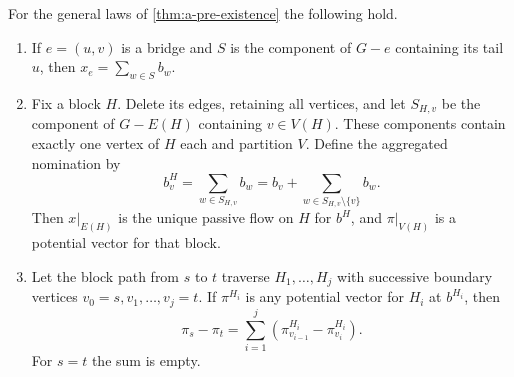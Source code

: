 \begin{lemma}
\label{lem:a-pre-block}
For the general laws of \cref{thm:a-pre-existence} the following hold.
\begin{enumerate}
\item If $e=(u,v)$ is a bridge and $S$ is the component of $G-e$
containing its tail $u$, then $x_e=\sum_{w\in S}b_w$.
\item Fix a block $H$. Delete its edges, retaining all vertices, and let
$S_{H,v}$ be the component of $G-E(H)$ containing $v\in V(H)$.
These components contain exactly one vertex of $H$ each and partition
$V$. Define the aggregated nomination by
\begin{equation}
 b^H_v=\sum_{w\in S_{H,v}}b_w
      =b_v+\sum_{w\in S_{H,v}\setminus\{v\}}b_w.
 \label{eq:a-pre-aggregation}
\end{equation}
Then $x|_{E(H)}$ is the unique passive flow on $H$ for $b^H$, and
$\pi|_{V(H)}$ is a potential vector for that block.
\item Let the block path from $s$ to $t$ traverse $H_1,\ldots,H_j$
with successive boundary vertices $v_0=s,v_1,\ldots,v_j=t$.
If $\pi^{H_i}$ is any potential vector for $H_i$ at $b^{H_i}$, then
\begin{equation}
 \pi_s-\pi_t=\sum_{i=1}^j
       (\pi^{H_i}_{v_{i-1}}-\pi^{H_i}_{v_i}).
 \label{eq:a-pre-block-path}
\end{equation}
For $s=t$ the sum is empty.
\end{enumerate}
\end{lemma}
